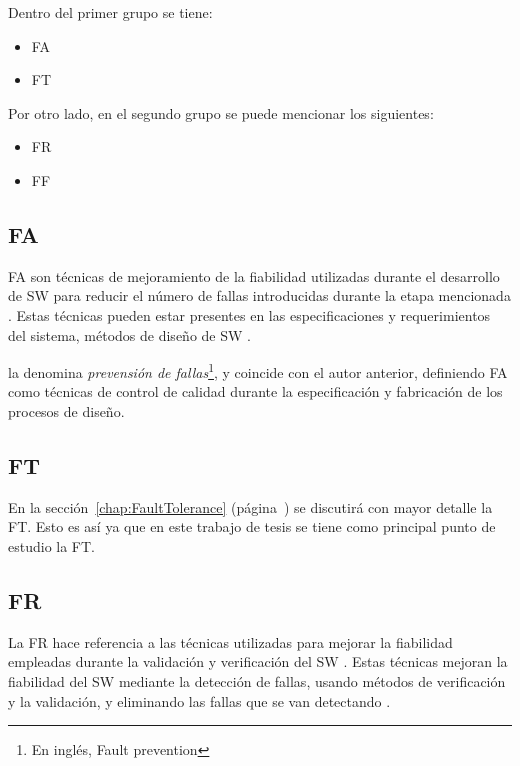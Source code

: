 Dentro del primer grupo se tiene:
\begin{itemize}
 \item \acl{FA}
 \item \acl{FT}
\end{itemize}

Por otro lado, en el segundo grupo se puede mencionar los siguientes:
\begin{itemize}
 \item \acl{FR}
 \item \acl{FF}
\end{itemize}

\subsection{\acl{FA}}
\ac{FA} son técnicas de mejoramiento de la fiabilidad utilizadas durante el desarrollo de \ac{SW}
para reducir el número de fallas introducidas durante la etapa mencionada \citep{Pullum01}. Estas
técnicas pueden estar presentes en las especificaciones y requerimientos del sistema, métodos de
diseño de \ac{SW} \citep{Pullum01}.

\cite{FTDesign} la denomina \textit{prevensión de fallas}\footnote{En inglés, Fault prevention}, y
coincide con el autor anterior, definiendo \ac{FA} como técnicas de control de calidad durante la
especificación y fabricación de los procesos de diseño.


\subsection{\acl{FT}}
En la sección~\ref{chap:FaultTolerance} (página~\pageref{chap:FaultTolerance}) se discutirá con
mayor detalle la \ac{FT}. Esto es así ya que en este trabajo de tesis se tiene como principal punto
de estudio la \acl{FT}.

\subsection{\acl{FR}}
La \ac{FR} hace referencia a las técnicas utilizadas para mejorar la fiabilidad empleadas durante
la validación y verificación del \ac{SW} \citep{Pullum01}. Estas técnicas mejoran la fiabilidad del
\ac{SW} mediante la detección de fallas, usando métodos de verificación y la validación, y
eliminando las fallas que se van detectando \citep{Pullum01}.

